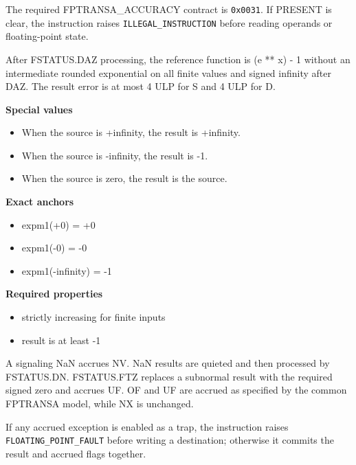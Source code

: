 The required FPTRANSA\_ACCURACY contract is \texttt{0x0031}. If PRESENT is clear, the instruction raises \texttt{ILLEGAL\_INSTRUCTION} before reading operands or floating-point state.

After FSTATUS.DAZ processing, the reference function is (e ** x) - 1 without an intermediate rounded exponential on all finite values and signed infinity after DAZ. The result error is at most 4 ULP for S and 4 ULP for D.

\textbf{Special values}\par
\begin{itemize}
\item When the source is +infinity, the result is +infinity.
\item When the source is -infinity, the result is -1.
\item When the source is zero, the result is the source.
\end{itemize}

\textbf{Exact anchors}\par
\begin{itemize}
\item expm1(+0) = +0
\item expm1(-0) = -0
\item expm1(-infinity) = -1
\end{itemize}

\textbf{Required properties}\par
\begin{itemize}
\item strictly increasing for finite inputs
\item result is at least -1
\end{itemize}

A signaling NaN accrues NV. NaN results are quieted and then processed by FSTATUS.DN. FSTATUS.FTZ replaces a subnormal result with the required signed zero and accrues UF. OF and UF are accrued as specified by the common FPTRANSA model, while NX is unchanged.

If any accrued exception is enabled as a trap, the instruction raises \texttt{FLOATING\_POINT\_FAULT} before writing a destination; otherwise it commits the result and accrued flags together.
